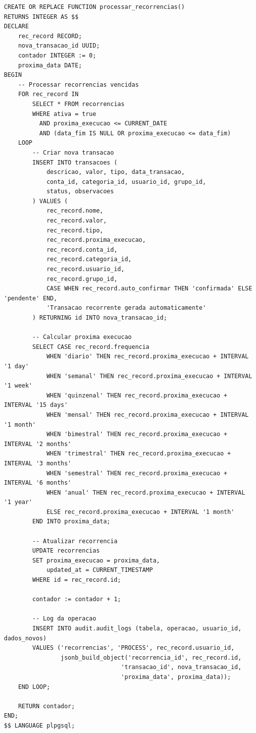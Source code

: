 \begin{lstlisting}[caption=Funcao para processar transacoes recorrentes]
CREATE OR REPLACE FUNCTION processar_recorrencias()
RETURNS INTEGER AS $$
DECLARE
    rec_record RECORD;
    nova_transacao_id UUID;
    contador INTEGER := 0;
    proxima_data DATE;
BEGIN
    -- Processar recorrencias vencidas
    FOR rec_record IN 
        SELECT * FROM recorrencias 
        WHERE ativa = true 
          AND proxima_execucao <= CURRENT_DATE
          AND (data_fim IS NULL OR proxima_execucao <= data_fim)
    LOOP
        -- Criar nova transacao
        INSERT INTO transacoes (
            descricao, valor, tipo, data_transacao,
            conta_id, categoria_id, usuario_id, grupo_id,
            status, observacoes
        ) VALUES (
            rec_record.nome,
            rec_record.valor,
            rec_record.tipo,
            rec_record.proxima_execucao,
            rec_record.conta_id,
            rec_record.categoria_id,
            rec_record.usuario_id,
            rec_record.grupo_id,
            CASE WHEN rec_record.auto_confirmar THEN 'confirmada' ELSE 'pendente' END,
            'Transacao recorrente gerada automaticamente'
        ) RETURNING id INTO nova_transacao_id;
        
        -- Calcular proxima execucao
        SELECT CASE rec_record.frequencia
            WHEN 'diario' THEN rec_record.proxima_execucao + INTERVAL '1 day'
            WHEN 'semanal' THEN rec_record.proxima_execucao + INTERVAL '1 week'
            WHEN 'quinzenal' THEN rec_record.proxima_execucao + INTERVAL '15 days'
            WHEN 'mensal' THEN rec_record.proxima_execucao + INTERVAL '1 month'
            WHEN 'bimestral' THEN rec_record.proxima_execucao + INTERVAL '2 months'
            WHEN 'trimestral' THEN rec_record.proxima_execucao + INTERVAL '3 months'
            WHEN 'semestral' THEN rec_record.proxima_execucao + INTERVAL '6 months'
            WHEN 'anual' THEN rec_record.proxima_execucao + INTERVAL '1 year'
            ELSE rec_record.proxima_execucao + INTERVAL '1 month'
        END INTO proxima_data;
        
        -- Atualizar recorrencia
        UPDATE recorrencias 
        SET proxima_execucao = proxima_data,
            updated_at = CURRENT_TIMESTAMP
        WHERE id = rec_record.id;
        
        contador := contador + 1;
        
        -- Log da operacao
        INSERT INTO audit.audit_logs (tabela, operacao, usuario_id, dados_novos)
        VALUES ('recorrencias', 'PROCESS', rec_record.usuario_id,
                jsonb_build_object('recorrencia_id', rec_record.id, 
                                 'transacao_id', nova_transacao_id,
                                 'proxima_data', proxima_data));
    END LOOP;
    
    RETURN contador;
END;
$$ LANGUAGE plpgsql;
\end{lstlisting}

